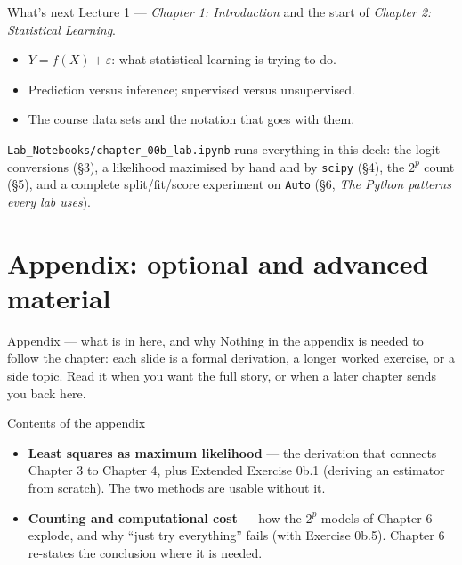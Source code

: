 \documentclass[aspectratio=169,11pt]{beamer}
\begin{document}
\begin{frame}{What's next}
  Lecture 1 --- \emph{Chapter 1: Introduction} and the start of
  \emph{Chapter 2: Statistical Learning}.
  \begin{itemize}
    \item $Y = f(X) + \varepsilon$: what statistical learning is trying to do.
    \item Prediction versus inference; supervised versus unsupervised.
    \item The course data sets and the notation that goes with them.
  \end{itemize}
  \begin{labnote}
    \texttt{Lab\_Notebooks/chapter\_00b\_lab.ipynb} runs everything in this
    deck: the logit conversions (\S3), a likelihood maximised by hand and by
    \texttt{scipy} (\S4), the $2^p$ count (\S5), and a complete
    split/fit/score experiment on \texttt{Auto} (\S6,
    \emph{The Python patterns every lab uses}).
  \end{labnote}
\end{frame}


\appendix
\AtBeginSection[]{}
\section{Appendix: optional and advanced material}

\begin{frame}{Appendix --- what is in here, and why}
  \small
  Nothing in the appendix is needed to follow the chapter: each slide is a
  formal derivation, a longer worked exercise, or a side topic. Read it when
  you want the full story, or when a later chapter sends you back here.
  \begin{block}{Contents of the appendix}
    \begin{itemize}
      \item \textbf{Least squares as maximum likelihood} --- the derivation that connects Chapter 3 to Chapter 4, plus Extended Exercise 0b.1 (deriving an estimator from scratch). The two methods are usable without it.
      \item \textbf{Counting and computational cost} --- how the $2^p$ models of Chapter 6 explode, and why ``just try everything'' fails (with Exercise 0b.5). Chapter 6 re-states the conclusion where it is needed.
    \end{itemize}
  \end{block}
\end{frame}
\end{document}
